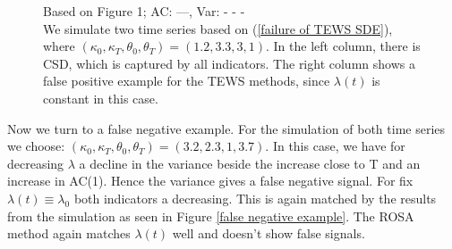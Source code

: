 \documentclass[%
thesis=student,%
coverpage=false,%
titlepage=false,%
headmarks=true, %
english,%
font=libertine, %
math=newpxtx, %
BCOR=5mm,%
coverBCOR=11mm%
]{tumbook}
\begin{document}
\begin{figure}
\begin{minipage}{0.49\textwidth}
    \end{minipage}
    \begin{minipage}{\textwidth}
    \centering
    \caption{Based on \cite{Morr:2024} Figure 1; AC: ---, Var: - - - \\
    We simulate two time series based on (\ref{failure of TEWS SDE}), where $(\kappa_{0},\kappa_{T},\theta_{0},\theta_{T}) = (1.2,3.3,3,1)$. In the left column, there is CSD, which is captured by all indicators. The right column shows a false positive example for the TEWS methods, since $\lambda(t)$ is constant in this case. 
    }
    \label{false positive example}
    \end{minipage}
\end{figure}


Now we turn to a false negative example. For the simulation of both time series we choose: $(\kappa_{0},\kappa_{T},\theta_{0},\theta_{T}) = (3.2,2.3,1,3.7)$. In this case, we have for decreasing $\lambda$ a decline in the variance beside the increase close to T and an increase in AC(1). Hence the variance gives a false negative signal. For fix $\lambda(t) \equiv \lambda_{0}$ both indicators a decreasing. This is again matched by the results from the simulation as seen in Figure \ref{false negative example}. The ROSA method again matches $\lambda(t)$ well and doesn't show false signals.
\end{document}

